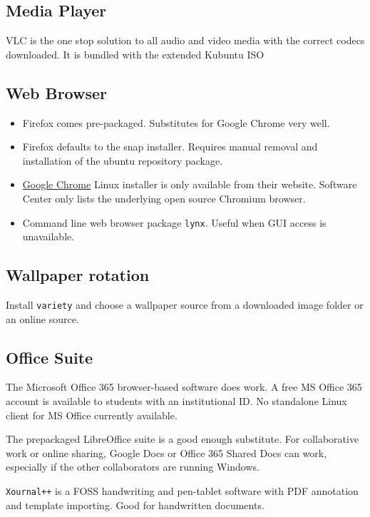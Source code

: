 \documentclass[8pt,a4paper]{article}
\begin{document}
\subsection{Media Player}

VLC is the one stop solution to all audio and video media with the correct codecs downloaded. It is bundled with the extended Kubuntu ISO

\subsection{Web Browser}

\begin{itemize}
	\item Firefox comes pre-packaged. Substitutes for Google Chrome very well.
	\item Firefox defaults to the snap installer. Requires manual removal and installation of the ubuntu repository package.
	\item \href{https://www.google.com/chrome/?platform=linux}{Google Chrome} Linux installer is only available from their website. Software Center only lists the underlying open source Chromium browser.
	\item Command line web browser package \texttt{lynx}. Useful when GUI access is unavailable.

\end{itemize}

\subsection{Wallpaper rotation}

Install \texttt{variety} and choose a wallpaper source from a downloaded image folder or an online source.
\subsection{Office Suite}

The Microsoft Office 365 browser-based software does work. A free MS Office 365 account is available to students with an institutional ID. No standalone Linux client for MS Office currently available.

The prepackaged LibreOffice suite is a good enough substitute. For collaborative work or online sharing, Google Docs or Office 365 Shared Docs can work, especially if the other collaborators are running Windows.

\texttt{Xournal++} is a FOSS handwriting and pen-tablet software with PDF annotation and template importing. Good for handwritten documents.
\end{document}
